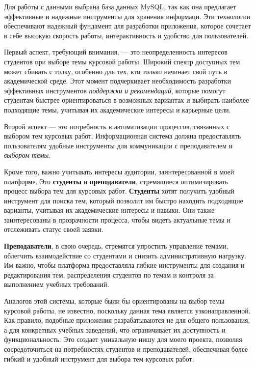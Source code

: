 \documentclass[14pt]{extarticle} %
\begin{document}
Для работы с данными выбрана база данных MySQL, так как она предлагает эффективные и надежные инструменты для хранения информаци. Эти технологии обеспечивают надежный фундамент для разработки приложения, которое сочетает в себе высокую скорость работы, интерактивность и удобство для пользователей.




Первый аспект, требующий внимания, — это неопределенность интересов студентов при выборе темы курсовой работы. Широкий спектр доступных тем может сбивать с толку, особенно для тех, кто только начинает свой путь в академической среде. Этот момент подчеркивает необходимость разработки эффективных инструментов \textit{поддержки и рекомендаций}, которые помогут студентам быстрее ориентироваться в возможных вариантах и выбирать наиболее подходящие темы, учитывая их академические интересы и карьерные цели.

Второй аспект --- это потребность в автоматизации процессов, связанных с выбором тем курсовых работ. Информационная система должна предоставлять пользователям удобные инструменты для коммуникации с преподавателем и \textit{выбором темы}.

Кроме того, важно учитывать интересы аудитории, заинтересованной в моей платформе. Это \textbf{студенты} и \textbf{преподаватели}, стремящиеся оптимизировать процесс выбора тем для курсовых работ. \textbf{Студенты} хотят получить удобный инструмент для поиска тем, который позволит им быстро находить подходящие варианты, учитывая их академические интересы и навыки. Они также заинтересованы в прозрачности процесса, чтобы видеть актуальные темы и отслеживать статус своей заявки.

\textbf{Преподаватели}, в свою очередь, стремятся упростить управление темами, облегчить взаимодействие со студентами и снизить административную нагрузку. Им важно, чтобы платформа предоставляла гибкие инструменты для создания и редактирования тем, распределения студентов по темам и контроля за выполнением учебных требований.

Аналогов этой системы, которые были бы ориентированы на выбор темы курсовой работы, не известно, поскольку данная тема является узконаправленной. Как правило, подобные приложения разрабатываются не для общего пользования, а для конкретных учебных заведений, что ограничивает их доступность и функциональность. Это создает уникальную нишу для моего проекта, позволяя сосредоточиться на потребностях студентов и преподавателей, обеспечивая более гибкий и удобный инструмент для выбора тем курсовых работ.
\end{document}

